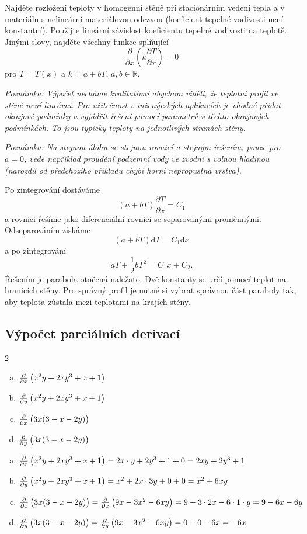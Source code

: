 Najděte rozložení teploty v homogenní stěně při stacionárním vedení
tepla a v materiálu s nelineární materiálovou odezvou (koeficient
tepelné vodivosti není konstantní).  Použijte lineární závislost
koeficientu tepelné vodivosti na teplotě.  Jinými slovy, najděte
všechny funkce splňující
$$\frac{\partial}{\partial x} \left(k \frac{\partial T}{\partial x}\right)=0$$
pro $T=T(x)$ a $k=a+bT$, $a,b\in \mathbb R$.

\textit{Poznámka: Výpočet necháme kvalitativní abychom viděli, že teplotní profil ve stěně není lineární. Pro užitečnost v inženýrských aplikacích je vhodné přidat okrajové podmínky a vyjádřit řešení pomocí parametrů v těchto okrajových podmínkách. To jsou typicky teploty na jednotlivých stranách stěny.}

\textit{Poznámka: Na stejnou úlohu se stejnou rovnicí a stejným řešením, pouze pro $a=0$, vede například proudění podzemní vody ve zvodni s volnou hladinou (narozdíl od předchozího příkladu chybí horní nepropustná vrstva).}

\reseni
Po zintegrování dostáváme
$$(a+bT)\frac{\partial T}{\partial x}=C_1$$
a rovnici řešíme jako diferenciální rovnici se separovanými proměnnými.
Odseparováním získáme
$$(a+bT)\mathrm dT=C_1\mathrm dx$$
a po zintegrování
$$aT+\frac 12bT^2 = C_1x+C_2.$$
Řešením je
parabola otočená naležato. Dvě konstanty se určí pomocí teplot na hranicích stěny. Pro správný profil je nutné si vybrat
správnou část paraboly tak, aby teplota zůstala mezi teplotami na
krajích stěny.
\konec


\subsection{Výpočet  parciálních derivací}

\newcommand\pd[2][x]{\frac{\partial }{\partial #1}\left(\vphantom {\frac 22}#2\right)}
\begin{multicols}2
\begin{enumerate}[a)]
\item $\pd{x^2y+2xy^3+x+1}$
\item $\pd[y]{x^2y+2xy^3+x+1}$
\item $\pd{3x(3-x-2y)}$
\item $\pd[y]{3x(3-x-2y)}$
\end{enumerate}
\end{multicols}

\reseni
\begin{enumerate}[a)]
\item $\pd{x^2y+2xy^3+x+1}=2x\cdot y+2y^3+1+0=2xy+2y^3+1$
\item $\pd[y]{x^2y+2xy^3+x+1}=x^2+2x\cdot 3y+0+0=x^2+6xy$
\item $\pd{3x(3-x-2y)}=\pd{9x-3x^2-6xy}=9-3\cdot 2x-6\cdot 1\cdot y=9-6x-6y$
\item $\pd[y]{3x(3-x-2y)}=\pd[y]{9x-3x^2-6xy}=0-0-6x=-6x$
\end{enumerate}

